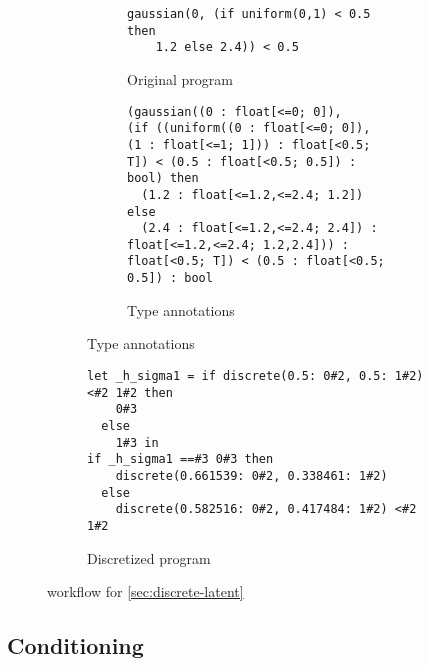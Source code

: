 \documentclass[acmsmall,screen,dvipsnames,x11names,nonacm,anonymous,review]{acmart}
\newcommand{\Slice}{\text{\scshape Slice}\xspace}
\begin{document}
\begin{figure}[ht]
\centering
\begin{subfigure}[t]{0.48\textwidth}  %
  \centering
  \begin{subfigure}[t]{\textwidth}
    \begin{lstlisting}
gaussian(0, (if uniform(0,1) < 0.5 then 
    1.2 else 2.4)) < 0.5
    \end{lstlisting}
    \caption{Original program}
    \label{fig:subA}
  \end{subfigure}

  \vspace{2em} %

  \begin{subfigure}[t]{\textwidth}
  \begin{lstlisting}
(gaussian((0 : float[<=0; 0]), 
(if ((uniform((0 : float[<=0; 0]), (1 : float[<=1; 1])) : float[<0.5; T]) < (0.5 : float[<0.5; 0.5]) : bool) then
  (1.2 : float[<=1.2,<=2.4; 1.2])
else
  (2.4 : float[<=1.2,<=2.4; 2.4]) : float[<=1.2,<=2.4; 1.2,2.4])) : float[<0.5; T]) < (0.5 : float[<0.5; 0.5]) : bool
\end{lstlisting}
    \caption{Type annotations}
    \label{fig:subC}
  \end{subfigure}
\end{subfigure}
\hfill
\begin{subfigure}[t]{0.48\textwidth}
    \begin{lstlisting}
let _h_sigma1 = if discrete(0.5: 0#2, 0.5: 1#2) <#2 1#2 then
    0#3
  else
    1#3 in
if _h_sigma1 ==#3 0#3 then
    discrete(0.661539: 0#2, 0.338461: 1#2)
  else
    discrete(0.582516: 0#2, 0.417484: 1#2) <#2 1#2
    \end{lstlisting}

  \caption{Discretized program}
  \label{fig:subB}
\end{subfigure}

\caption{\Slice workflow for \ref{sec:discrete-latent}}
\label{fig:main}
\end{figure}


\subsection{Conditioning}
\label{sec:observe}
\end{document}
